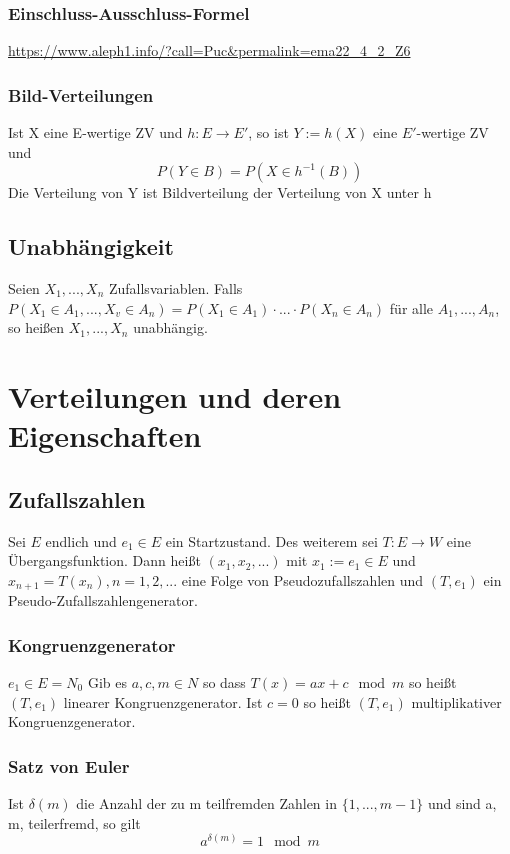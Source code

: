 \documentclass{report}
\begin{document}
\subsection*{Einschluss-Ausschluss-Formel}
\url{https://www.aleph1.info/?call=Puc&permalink=ema22_4_2_Z6}

\subsection*{Bild-Verteilungen}
Ist X eine E-wertige ZV und $h : E → E'$, so ist $Y := h(X)$ eine $E'$-wertige ZV und
 \[P(Y \in B) = P(X \in h^{-1}(B))\]
Die Verteilung von Y ist Bildverteilung der Verteilung von X unter h

\section*{Unabhängigkeit}
Seien $X_1, ..., X_n$ Zufallsvariablen. Falls $P(X_1 \in A_1, ..., X_v \in A_n) = P(X_1 \in A_1) \cdot ... \cdot P(X_n \in A_n)$ für alle $A_1, ..., A_n$, so heißen $X_1, ..., X_n$ unabhängig.

\chapter*{Verteilungen und deren Eigenschaften}

\section*{Zufallszahlen}
Sei $E$ endlich und $e_1 \in E$ ein Startzustand. Des weiterem sei $T : E \rightarrow W$ eine Übergangsfunktion. Dann heißt $(x_1, x_2, ...)$ mit $x_1 := e_1 \in E$ und $x_{n+1} = T(x_n), n = 1, 2, ...$ eine Folge von Pseudozufallszahlen und $(T, e_1)$ ein Pseudo-Zufallszahlengenerator. 
\subsection*{Kongruenzgenerator}
$e_1 \in E = N_0$ Gib es $a, c, m \in N$ so dass $T(x) = ax + c \mod m$ so heißt $(T, e_1)$ linearer Kongruenzgenerator. Ist $c = 0$ so heißt $(T, e_1)$ multiplikativer Kongruenzgenerator.
\subsection*{Satz von Euler}
Ist $\delta(m)$ die Anzahl der zu m teilfremden Zahlen in $\{1, ..., m - 1\}$ und sind a, m, teilerfremd, so gilt \[a^{\delta(m)} = 1 \mod m\]
\end{document}
